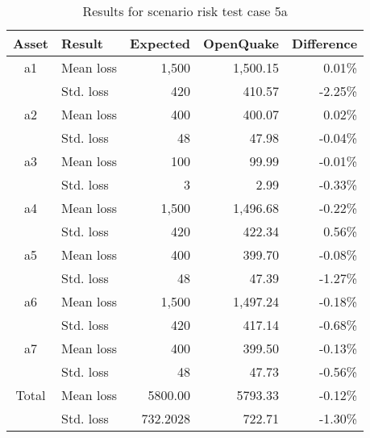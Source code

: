 \begin{table}[htbp]

\centering
\begin{tabular}{ c l r r r }

\hline
\rowcolor{anti-flashwhite}
\bf{Asset} & \bf{Result} & \bf{Expected} & \bf{OpenQuake} & \bf{Difference}\\
\hline
a1 & Mean loss & 1,500 & 1,500.15 & 0.01\% \\
 & Std. loss & 420 & 410.57 & -2.25\% \\
\hline
a2 & Mean loss & 400 & 400.07 & 0.02\% \\
 & Std. loss & 48 & 47.98 & -0.04\% \\
\hline
a3 & Mean loss & 100 & 99.99 & -0.01\% \\
 & Std. loss & 3 & 2.99 & -0.33\% \\
\hline
a4 & Mean loss & 1,500 & 1,496.68 & -0.22\% \\
 & Std. loss & 420 & 422.34 & 0.56\% \\
\hline
a5 & Mean loss & 400 & 399.70 & -0.08\% \\
 & Std. loss & 48 & 47.39 & -1.27\% \\
\hline
a6 & Mean loss & 1,500 & 1,497.24 & -0.18\% \\
 & Std. loss & 420 & 417.14 & -0.68\% \\
\hline
a7 & Mean loss & 400 & 399.50 & -0.13\% \\
 & Std. loss & 48 & 47.73 & -0.56\% \\
\hline
Total & Mean loss & 5800.00 & 5793.33 & -0.12\% \\
 & Std. loss & 732.2028 & 722.71 & -1.30\% \\
\hline
\end{tabular}

\caption{Results for scenario risk test case 5a}
\label{tab:result-scenario-risk-5a}
\end{table}